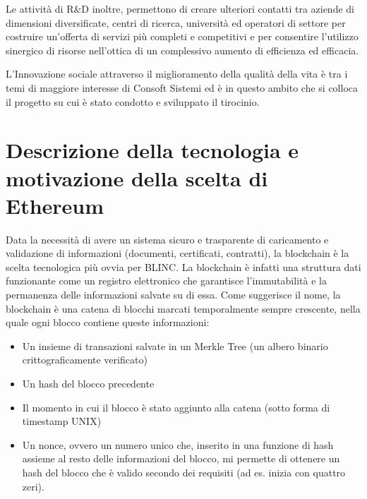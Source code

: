 Le attività di R\&D inoltre, permettono di creare ulteriori contatti tra aziende di dimensioni diversificate, centri di ricerca,
università ed operatori di settore per costruire un’offerta di servizi più completi e competitivi e per consentire l’utilizzo sinergico di risorse
nell'ottica di un complessivo aumento di efficienza ed efficacia.

L’Innovazione sociale attraverso il miglioramento della qualità della vita è tra i temi di maggiore interesse di Consoft Sistemi ed è in questo ambito
che si colloca il progetto su cui è stato condotto e sviluppato il tirocinio.


\section{Descrizione della tecnologia e motivazione della scelta di Ethereum}
Data la necessità di avere un sistema sicuro e trasparente di caricamento e validazione di informazioni (documenti, certificati, contratti), la blockchain è la scelta tecnologica più ovvia per BLINC.
La blockchain è infatti una struttura dati funzionante come un registro elettronico che garantisce l’immutabilità e la permanenza delle informazioni salvate su di essa.
Come suggerisce il nome, la blockchain è una catena di blocchi marcati temporalmente sempre crescente, nella quale ogni blocco contiene queste informazioni:
\begin{itemize}
    \item Un insieme di transazioni salvate in un Merkle Tree (un albero binario crittograficamente verificato)
    \item Un hash del blocco precedente
    \item Il momento in cui il blocco è stato aggiunto alla catena (sotto forma di timestamp UNIX)
    \item Un nonce, ovvero un numero unico che, inserito in una funzione di hash assieme al resto delle informazioni del blocco,
    mi permette di ottenere un hash del blocco che è valido secondo dei requisiti (ad es. inizia con quattro zeri).
\end{itemize}

